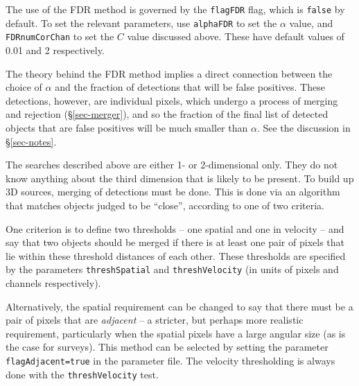 The use of the FDR method is governed by the \texttt{flagFDR} flag,
which is \texttt{false} by default. To set the relevant parameters,
use \texttt{alphaFDR} to set the $\alpha$ value, and
\texttt{FDRnumCorChan} to set the $C$ value discussed above. These
have default values of 0.01 and 2 respectively.

The theory behind the FDR method implies a direct connection between
the choice of $\alpha$ and the fraction of detections that will be
false positives. These detections, however, are individual pixels,
which undergo a process of merging and rejection (\S\ref{sec-merger}),
and so the fraction of the final list of detected objects that are
false positives will be much smaller than $\alpha$. See the discussion
in \S\ref{sec-notes}.

%

\label{sec-merger}


The searches described above are either 1- or 2-dimensional only. They
do not know anything about the third dimension that is likely to be
present. To build up 3D sources, merging of detections must be
done. This is done via an algorithm that matches objects judged to be
``close'', according to one of two criteria.

One criterion is to define two thresholds -- one spatial and one in
velocity -- and say that two objects should be merged if there is at
least one pair of pixels that lie within these threshold distances of
each other. These thresholds are specified by the parameters
\texttt{threshSpatial} and \texttt{threshVelocity} (in units of pixels
and channels respectively).

Alternatively, the spatial requirement can be changed to say that
there must be a pair of pixels that are \emph{adjacent} -- a stricter,
but perhaps more realistic requirement, particularly when the spatial
pixels have a large angular size (as is the case for \hi
surveys). This method can be selected by setting the parameter
\texttt{flagAdjacent=true} in the parameter file. The velocity
thresholding is always done with the \texttt{threshVelocity} test. 


